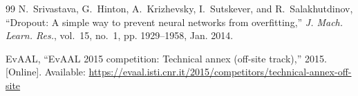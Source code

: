 \documentclass[conference]{IEEEtran}
\begin{document}
\begin{thebibliography}{99}
N.~Srivastava, G.~Hinton, A.~Krizhevsky, I.~Sutskever, and R.~Salakhutdinov, ``Dropout: A simple way to prevent neural networks from overfitting,'' \emph{J. Mach. Learn. Res.}, vol.~15, no.~1, pp. 1929--1958, Jan. 2014.

{EvAAL}, ``EvAAL 2015 competition: Technical annex (off-site track),'' 2015. [Online]. Available: \url{https://evaal.isti.cnr.it/2015/competitors/technical-annex-off-site}

\end{thebibliography}
\end{document}
